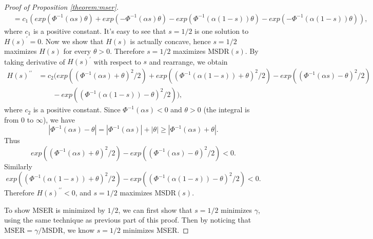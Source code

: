 \documentclass[11pt]{article}
\begin{document}
\begin{proof}[Proof of  Proposition \ref{theorem:mser}]
\begin{equation}
\begin{split}
			& = c_1(exp(\Phi^{-1}(\alpha s)\theta)+exp(-\Phi^{-1}(\alpha s)\theta) 
			-exp(\Phi^{-1}(\alpha (1-s))\theta) -exp(-\Phi^{-1}(\alpha (1-s))\theta)), 
			\label{eq:solution}
		\end{split}
	\end{equation}
	where $c_1$ is a positive constant. It's easy to see that $s=1/2$ is one solution to $H(s)^\prime = 0$. Now we show that $H(s)$ is actually concave, hence $s=1/2$ maximizes $H(s)$ for every $\theta > 0$. Therefore $s=1/2$ maximizes $\text{MSDR}(s)$. By taking derivative of $H(s)^\prime$ with respect to $s$ and rearrange, we obtain
	\begin{equation*}
		\begin{split}
			H(s)^{\prime\prime} &= c_2(exp( (\Phi^{-1}(\alpha s)+\theta)^2/2 )  
			+exp( (\Phi^{-1}(\alpha (1-s))+\theta)^2/2 )
			-exp( (\Phi^{-1}(\alpha s)-\theta)^2/2 )
			\\ & \quad \quad -exp( (\Phi^{-1}(\alpha (1-s))-\theta)^2/2 )
			),
		\end{split}
	\end{equation*}
	where $c_2$ is a positive constant. Since $\Phi^{-1}(\alpha s) < 0 $ and $\theta > 0 $ (the integral is from 0 to $\infty$), we have 
	\begin{equation*}
		|\Phi^{-1}(\alpha s)-\theta| = |\Phi^{-1}(\alpha s)| + |\theta| \geq |\Phi^{-1}(\alpha s) + \theta|.
	\end{equation*}
	Thus 
	\begin{equation*}
		exp( (\Phi^{-1}(\alpha s)+\theta)^2/2 ) -exp( (\Phi^{-1}(\alpha s)-\theta)^2/2 ) < 0.
	\end{equation*}
	Similarly 
	\begin{equation*}
		exp( (\Phi^{-1}(\alpha (1-s))+\theta)^2/2 ) -exp( (\Phi^{-1}(\alpha (1-s))-\theta)^2/2 ) < 0.
	\end{equation*}
	Therefore $H(s)^{\prime\prime} < 0$, and $s=1/2$ maximizes $\text{MSDR}(s)$.
	
	To show MSER is minimized by $1/2$, we can first show that $s=1/2$ minimizes $\gamma$, using the same technique as previous part of this proof. Then by noticing that $\text{MSER} = \gamma/\text{MSDR}$, we know $s=1/2$ minimizes MSER.
\end{proof}



\end{document}
